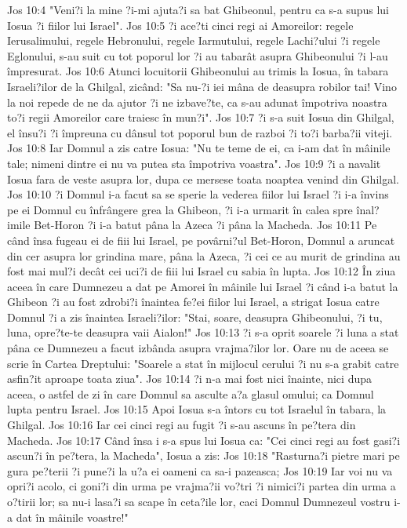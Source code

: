 Jos 10:4  "Veni?i la mine ?i-mi ajuta?i sa bat Ghibeonul, pentru ca s-a supus lui Iosua ?i fiilor lui Israel".
Jos 10:5  ?i ace?ti cinci regi ai Amoreilor: regele Ierusalimului, regele Hebronului, regele Iarmutului, regele Lachi?ului ?i regele Eglonului, s-au suit cu tot poporul lor ?i au tabarât asupra Ghibeonului ?i l-au împresurat.
Jos 10:6  Atunci locuitorii Ghibeonului au trimis la Iosua, în tabara Israeli?ilor de la Ghilgal, zicând: "Sa nu-?i iei mâna de deasupra robilor tai! Vino la noi repede de ne da ajutor ?i ne izbave?te, ca s-au adunat împotriva noastra to?i regii Amoreilor care traiesc în mun?i".
Jos 10:7  ?i s-a suit Iosua din Ghilgal, el însu?i ?i împreuna cu dânsul tot poporul bun de razboi ?i to?i barba?ii viteji.
Jos 10:8  Iar Domnul a zis catre Iosua: "Nu te teme de ei, ca i-am dat în mâinile tale; nimeni dintre ei nu va putea sta împotriva voastra".
Jos 10:9  ?i a navalit Iosua fara de veste asupra lor, dupa ce mersese toata noaptea venind din Ghilgal.
Jos 10:10  ?i Domnul i-a facut sa se sperie la vederea fiilor lui Israel ?i i-a învins pe ei Domnul cu înfrângere grea la Ghibeon, ?i i-a urmarit în calea spre înal?imile Bet-Horon ?i i-a batut pâna la Azeca ?i pâna la Macheda.
Jos 10:11  Pe când însa fugeau ei de fiii lui Israel, pe povârni?ul Bet-Horon, Domnul a aruncat din cer asupra lor grindina mare, pâna la Azeca, ?i cei ce au murit de grindina au fost mai mul?i decât cei uci?i de fiii lui Israel cu sabia în lupta.
Jos 10:12  În ziua aceea în care Dumnezeu a dat pe Amorei în mâinile lui Israel ?i când i-a batut la Ghibeon ?i au fost zdrobi?i înaintea fe?ei fiilor lui Israel, a strigat Iosua catre Domnul ?i a zis înaintea Israeli?ilor: "Stai, soare, deasupra Ghibeonului, ?i tu, luna, opre?te-te deasupra vaii Aialon!"
Jos 10:13  ?i s-a oprit soarele ?i luna a stat pâna ce Dumnezeu a facut izbânda asupra vrajma?ilor lor. Oare nu de aceea se scrie în Cartea Dreptului: "Soarele a stat în mijlocul cerului ?i nu s-a grabit catre asfin?it aproape toata ziua".
Jos 10:14  ?i n-a mai fost nici înainte, nici dupa aceea, o astfel de zi în care Domnul sa asculte a?a glasul omului; ca Domnul lupta pentru Israel.
Jos 10:15  Apoi Iosua s-a întors cu tot Israelul în tabara, la Ghilgal.
Jos 10:16  Iar cei cinci regi au fugit ?i s-au ascuns în pe?tera din Macheda.
Jos 10:17  Când însa i s-a spus lui Iosua ca: "Cei cinci regi au fost gasi?i ascun?i în pe?tera, la Macheda", Iosua a zis:
Jos 10:18  "Rasturna?i pietre mari pe gura pe?terii ?i pune?i la u?a ei oameni ca sa-i pazeasca;
Jos 10:19  Iar voi nu va opri?i acolo, ci goni?i din urma pe vrajma?ii vo?tri ?i nimici?i partea din urma a o?tirii lor; sa nu-i lasa?i sa scape în ceta?ile lor, caci Domnul Dumnezeul vostru i-a dat în mâinile voastre!"
